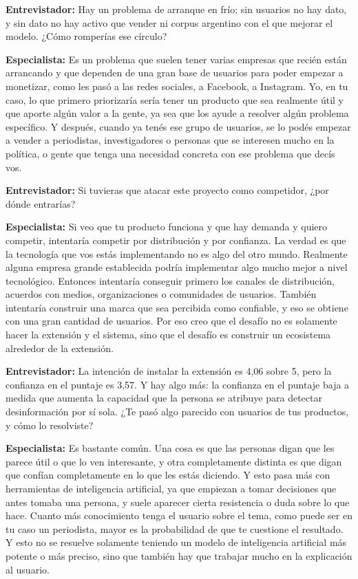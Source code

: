 \noindent\textbf{Entrevistador:} Hay un problema de arranque en frío: sin usuarios no hay dato, y sin dato no hay activo que vender ni corpus argentino con el que mejorar el modelo. ¿Cómo romperías ese círculo?

\noindent\textbf{Especialista:} Es un problema que suelen tener varias empresas que recién están arrancando y que dependen de una gran base de usuarios para poder empezar a monetizar, como les pasó a las redes sociales, a Facebook, a Instagram. Yo, en tu caso, lo que primero priorizaría sería tener un producto que sea realmente útil y que aporte algún valor a la gente, ya sea que los ayude a resolver algún problema específico. Y después, cuando ya tenés ese grupo de usuarios, se lo podés empezar a vender a periodistas, investigadores o personas que se interesen mucho en la política, o gente que tenga una necesidad concreta con ese problema que decís vos.

\medskip

\noindent\textbf{Entrevistador:} Si tuvieras que atacar este proyecto como competidor, ¿por dónde entrarías?

\noindent\textbf{Especialista:} Si veo que tu producto funciona y que hay demanda y quiero competir, intentaría competir por distribución y por confianza. La verdad es que la tecnología que vos estás implementando no es algo del otro mundo. Realmente alguna empresa grande establecida podría implementar algo mucho mejor a nivel tecnológico. Entonces intentaría conseguir primero los canales de distribución, acuerdos con medios, organizaciones o comunidades de usuarios. También intentaría construir una marca que sea percibida como confiable, y eso se obtiene con una gran cantidad de usuarios. Por eso creo que el desafío no es solamente hacer la extensión y el sistema, sino que el desafío es construir un ecosistema alrededor de la extensión.

\medskip

\noindent\textbf{Entrevistador:} La intención de instalar la extensión es 4,06 sobre 5, pero la confianza en el puntaje es 3,57. Y hay algo más: la confianza en el puntaje baja a medida que aumenta la capacidad que la persona se atribuye para detectar desinformación por sí sola. ¿Te pasó algo parecido con usuarios de tus productos, y cómo lo resolviste?

\noindent\textbf{Especialista:} Es bastante común. Una cosa es que las personas digan que les parece útil o que lo ven interesante, y otra completamente distinta es que digan que confían completamente en lo que les estás diciendo. Y esto pasa más con herramientas de inteligencia artificial, ya que empiezan a tomar decisiones que antes tomaba una persona, y suele aparecer cierta resistencia o duda sobre lo que hace. Cuanto más conocimiento tenga el usuario sobre el tema, como puede ser en tu caso un periodista, mayor es la probabilidad de que te cuestione el resultado. Y esto no se resuelve solamente teniendo un modelo de inteligencia artificial más potente o más preciso, sino que también hay que trabajar mucho en la explicación al usuario.

